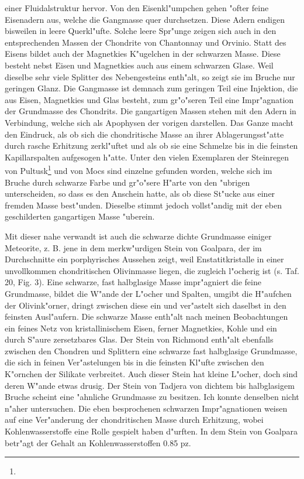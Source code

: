 \documentclass[a4paper, 11pt, oneside, polutonikogreek, german]{article}
\begin{document}
einer Fluidalstruktur hervor. Von den Eisenkl"umpchen gehen "ofter feine Eisenadern aus, welche die Gangmasse quer durchsetzen. Diese Adern endigen bisweilen in leere Querkl"ufte. Solche leere Spr"unge zeigen sich auch in den entsprechenden Massen der Chondrite von Chantonnay und Orvinio. Statt des Eisens bildet auch der Magnetkies K"ugelchen in der schwarzen Masse. Diese besteht nebst Eisen und Magnetkies auch aus einem schwarzen Glase. Weil dieselbe sehr viele Splitter des Nebengesteins enth"alt, so zeigt sie im Bruche nur geringen Glanz. Die Gangmasse ist demnach zum geringen Teil eine Injektion, die aus Eisen, Magnetkies und Glas besteht, zum gr"o"seren Teil eine Impr"agnation der Grundmasse des Chondrits. Die gangartigen Massen stehen mit den Adern in Verbindung, welche sich als Apophysen der vorigen darstellen. Das Ganze macht den Eindruck, als ob sich die chondritische Masse an ihrer Ablagerungsst"atte durch rasche Erhitzung zerkl"uftet und als ob sie eine Schmelze bis in die feinsten Kapillarspalten aufgesogen h"atte. Unter den vielen Exemplaren der Steinregen von Pultusk\footnote{} und von Mocs sind einzelne gefunden worden, welche sich im Bruche durch schwarze Farbe und gr"o"sere H"arte von den "ubrigen unterscheiden, so dass es den Anschein hatte, als ob diese St"ucke aus einer fremden Masse best"unden. Dieselbe stimmt jedoch vollst"andig mit der eben geschilderten gangartigen Masse "uberein.

Mit dieser nahe verwandt ist auch die schwarze dichte Grundmasse einiger Meteorite, z. B. jene in dem merkw"urdigen Stein von Goalpara, der im Durchschnitte ein porphyrisches Aussehen zeigt, weil Enstatitkristalle in einer unvollkommen chondritischen Olivinmasse liegen, die zugleich l"ocherig ist (s. Taf. 20, Fig. 3). Eine schwarze, fast halbglasige Masse impr"agniert die feine Grundmasse, bildet die W"ande der L"ocher und Spalten, umgibt die H"aufchen der Olivink"orner, dringt zwischen diese ein und ver"astelt sich daselbst in den feinsten Ausl"aufern. Die schwarze Masse enth"alt nach meinen Beobachtungen ein feines Netz von kristallinischem Eisen, ferner Magnetkies, Kohle und ein durch S"aure zersetzbares Glas. Der Stein von Richmond enth"alt ebenfalls zwischen den Chondren und Splittern eine schwarze fast halbglasige Grundmasse, die sich in feinen Ver"astelungen bis in die feinsten Kl"ufte zwischen den K"ornchen der Silikate verbreitet. Auch dieser Stein hat kleine L"ocher, doch sind deren W"ande etwas drusig. Der Stein von Tadjera von dichtem bis halbglasigem Bruche scheint eine "ahnliche Grundmasse zu besitzen. Ich konnte denselben nicht n"aher untersuchen. Die eben besprochenen schwarzen Impr"agnationen weisen auf eine Ver"anderung der chondritischen Masse durch Erhitzung, wobei Kohlenwasserstoffe eine Rolle gespielt haben d"urften. In dem Stein von Goalpara betr"agt der Gehalt an Kohlenwasserstoffen 0.85 pz.
\end{document}
